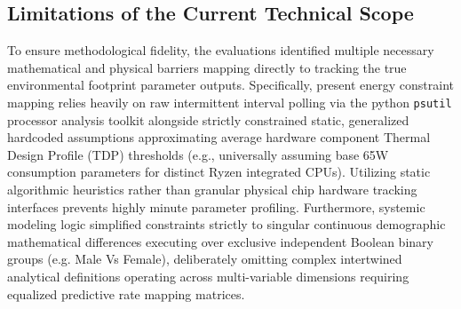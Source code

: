 \documentclass[12pt,a4paper]{article}
\begin{document}
\subsection{Limitations of the Current Technical Scope}
To ensure methodological fidelity, the evaluations identified multiple necessary mathematical and physical barriers mapping directly to tracking the true environmental footprint parameter outputs. Specifically, present energy constraint mapping relies heavily on raw intermittent interval polling via the python \texttt{psutil} processor analysis toolkit alongside strictly constrained static, generalized hardcoded assumptions approximating average hardware component Thermal Design Profile (TDP) thresholds (e.g., universally assuming base 65W consumption parameters for distinct Ryzen integrated CPUs). Utilizing static algorithmic heuristics rather than granular physical chip hardware tracking interfaces prevents highly minute parameter profiling. Furthermore, systemic modeling logic simplified constraints strictly to singular continuous demographic mathematical differences executing over exclusive independent Boolean binary groups (e.g. Male Vs Female), deliberately omitting complex intertwined analytical definitions operating across multi-variable dimensions requiring equalized predictive rate mapping matrices.
\end{document}
